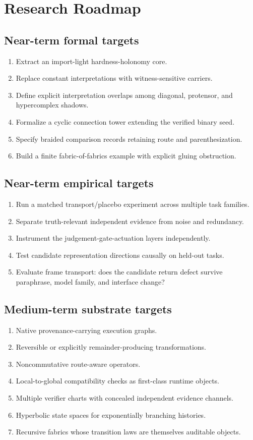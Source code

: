 \documentclass[12pt,openany]{book}
\theoremstyle{remark}
\begin{document}
\chapter{Research Roadmap}
\label{ch:roadmap}

\section{Near-term formal targets}
\begin{enumerate}
\item Extract an import-light hardness-holonomy core.
\item Replace constant interpretations with witness-sensitive carriers.
\item Define explicit interpretation overlaps among diagonal, protensor, and hypercomplex shadows.
\item Formalize a cyclic connection tower extending the verified binary seed.
\item Specify braided comparison records retaining route and parenthesization.
\item Build a finite fabric-of-fabrics example with explicit gluing obstruction.
\end{enumerate}

\section{Near-term empirical targets}
\begin{enumerate}
\item Run a matched transport/placebo experiment across multiple task families.
\item Separate truth-relevant independent evidence from noise and redundancy.
\item Instrument the judgement-gate-actuation layers independently.
\item Test candidate representation directions causally on held-out tasks.
\item Evaluate frame transport: does the candidate return defect survive paraphrase, model family, and interface change?
\end{enumerate}

\section{Medium-term substrate targets}
\begin{enumerate}
\item Native provenance-carrying execution graphs.
\item Reversible or explicitly remainder-producing transformations.
\item Noncommutative route-aware operators.
\item Local-to-global compatibility checks as first-class runtime objects.
\item Multiple verifier charts with concealed independent evidence channels.
\item Hyperbolic state spaces for exponentially branching histories.
\item Recursive fabrics whose transition laws are themselves auditable objects.
\end{enumerate}
\end{document}
